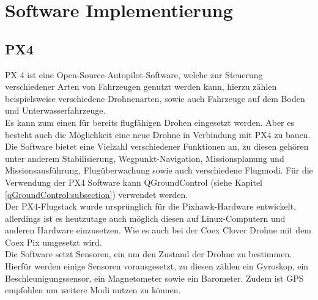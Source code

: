 \chapter{Software Implementierung}

\section{PX4} \label{px4:section}
PX 4 ist eine Open-Source-Autopilot-Software, welche zur Steuerung verschiedener Arten von Fahrzeugen genutzt werden kann, hierzu zählen beispielsweise verschiedene Drohnenarten, sowie auch Fahrzeuge auf dem Boden und Unterwasserfahrzeuge.\\ Es kann zum einen für bereits flugfähigen Drohen eingesetzt werden. Aber es besteht auch die Möglichkeit eine neue Drohne in Verbindung mit PX4 zu bauen.\\
Die Software bietet eine Vielzahl verschiedener Funktionen an, zu diesen gehören unter anderem Stabilisierung, Wegpunkt-Navigation, Missionsplanung und Missionsausführung, Flugüberwachung sowie auch verschiedene Flugmodi.
Für die Verwendung der PX4 Software kann QGroundControl (siehe Kapitel \ref{qGroundControl:subsection}) verwendet werden. \cite[vgl.][]{px4} \\

Der PX4-Flugstack wurde ursprünglich für die Pixhawk-Hardware entwickelt, allerdings ist es heutzutage auch möglich diesen auf Linux-Computern und anderen Hardware einzusetzen. Wie es auch bei der Coex Clover Drohne mit dem Coex Pix umgesetzt wird. \\
Die Software setzt Sensoren, ein um den Zustand der Drohne zu bestimmen. Hierfür werden einige Sensoren vorausgesetzt, zu diesen zählen ein Gyroskop, ein Beschleunigungssensor, ein Magnetometer sowie ein Barometer. Zudem ist GPS empfohlen um weitere Modi nutzen zu können. \cite[vgl.][]{px4}

